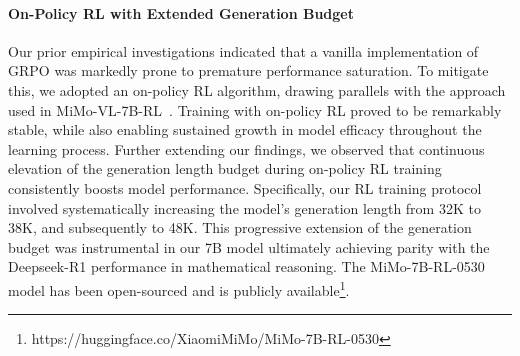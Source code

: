 \documentclass[11pt, a4paper, logo, copyright, nonumbering]{xiaomi}
\begin{document}
\begin{table}[htbp!]
\centering
{}
\caption{Model Performance Comparison on Various Benchmarks.
MiMo-7B-RL-0530 was evaluated at a 48K context length, its training length, while the other three models were assessed at their 32K training context length. Evaluations for Alignbench v1.1~\cite{liu2024alignbenchbenchmarkingchinesealignment} were conducted using GPT-4.1 as the judge.}
\label{tab:mimo_7b_0530} 
\end{table}


\paragraph{On-Policy RL with Extended Generation Budget}
Our prior empirical investigations indicated that a vanilla implementation of GRPO was markedly prone to premature performance saturation. To mitigate this, we adopted an on-policy RL algorithm, drawing parallels with the approach used in MiMo-VL-7B-RL~\cite{coreteam2025mimovltechnicalreport}. Training with on-policy RL proved to be remarkably stable, while also enabling sustained growth in model efficacy throughout the learning process. Further extending our findings, we observed that continuous elevation of the generation length budget during on-policy RL training consistently boosts model performance. Specifically, our RL training protocol involved systematically increasing the model's generation length from 32K to 38K, and subsequently to 48K. This progressive extension of the generation budget was instrumental in our 7B model ultimately achieving parity with the Deepseek-R1 performance in mathematical reasoning. The MiMo-7B-RL-0530 model has been open-sourced and is publicly available\footnote{https://huggingface.co/XiaomiMiMo/MiMo-7B-RL-0530}.
\end{document}
